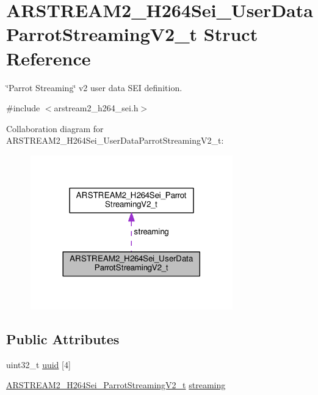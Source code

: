\hypertarget{struct_a_r_s_t_r_e_a_m2___h264_sei___user_data_parrot_streaming_v2__t}{}\section{A\+R\+S\+T\+R\+E\+A\+M2\+\_\+\+H264\+Sei\+\_\+\+User\+Data\+Parrot\+Streaming\+V2\+\_\+t Struct Reference}
\label{struct_a_r_s_t_r_e_a_m2___h264_sei___user_data_parrot_streaming_v2__t}


\char`\"{}\+Parrot Streaming\char`\"{} v2 user data S\+EI definition.  




{\ttfamily \#include $<$arstream2\+\_\+h264\+\_\+sei.\+h$>$}



Collaboration diagram for A\+R\+S\+T\+R\+E\+A\+M2\+\_\+\+H264\+Sei\+\_\+\+User\+Data\+Parrot\+Streaming\+V2\+\_\+t\+:
\nopagebreak
\begin{figure}[H]
\begin{center}
\leavevmode
\includegraphics[width=248pt]{struct_a_r_s_t_r_e_a_m2___h264_sei___user_data_parrot_streaming_v2__t__coll__graph}
\end{center}
\end{figure}
\subsection*{Public Attributes}
\begin{DoxyCompactItemize}
\item 
uint32\+\_\+t \hyperlink{struct_a_r_s_t_r_e_a_m2___h264_sei___user_data_parrot_streaming_v2__t_a7cf682b9ad05f41c9ac5e2b94f2417fa}{uuid} \mbox{[}4\mbox{]}
\item 
\hyperlink{struct_a_r_s_t_r_e_a_m2___h264_sei___parrot_streaming_v2__t}{A\+R\+S\+T\+R\+E\+A\+M2\+\_\+\+H264\+Sei\+\_\+\+Parrot\+Streaming\+V2\+\_\+t} \hyperlink{struct_a_r_s_t_r_e_a_m2___h264_sei___user_data_parrot_streaming_v2__t_a1536ddca45ca3179a0fc409b2a13899f}{streaming}
\end{DoxyCompactItemize}


